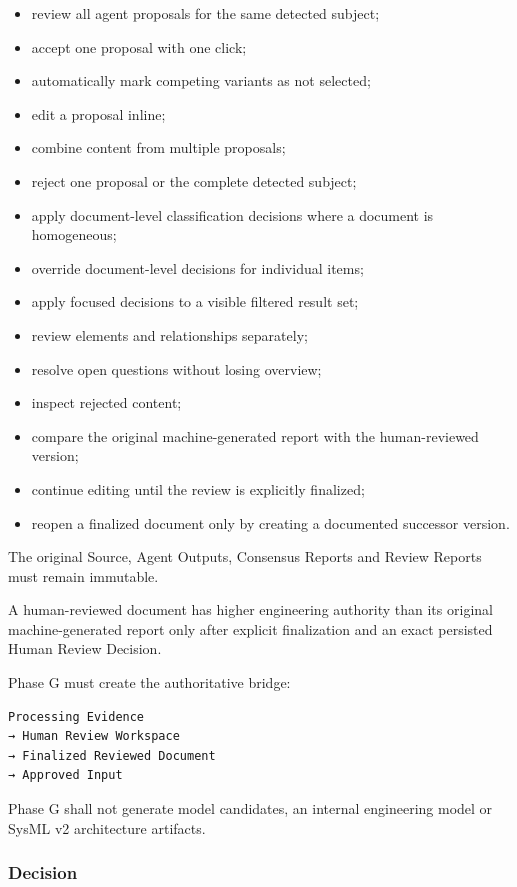 \begin{itemize}
\tightlist
\item
  review all agent proposals for the same detected subject;
\item
  accept one proposal with one click;
\item
  automatically mark competing variants as not selected;
\item
  edit a proposal inline;
\item
  combine content from multiple proposals;
\item
  reject one proposal or the complete detected subject;
\item
  apply document-level classification decisions where a document is homogeneous;
\item
  override document-level decisions for individual items;
\item
  apply focused decisions to a visible filtered result set;
\item
  review elements and relationships separately;
\item
  resolve open questions without losing overview;
\item
  inspect rejected content;
\item
  compare the original machine-generated report with the human-reviewed version;
\item
  continue editing until the review is explicitly finalized;
\item
  reopen a finalized document only by creating a documented successor version.
\end{itemize}

The original Source, Agent Outputs, Consensus Reports and Review Reports must remain immutable.

A human-reviewed document has higher engineering authority than its original machine-generated report only after explicit finalization and an exact persisted Human Review Decision.

Phase G must create the authoritative bridge:

\begin{verbatim}
Processing Evidence
→ Human Review Workspace
→ Finalized Reviewed Document
→ Approved Input
\end{verbatim}

Phase G shall not generate model candidates, an internal engineering model or SysML v2 architecture artifacts.

\hypertarget{decision-1}{%
\subsubsection{Decision}\label{decision-1}}

